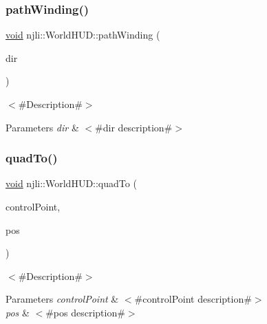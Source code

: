 \subsubsection{\texorpdfstring{path\+Winding()}{pathWinding()}}
{\footnotesize\ttfamily \mbox{\hyperlink{_thread_8h_af1e856da2e658414cb2456cb6f7ebc66}{void}} njli\+::\+World\+H\+U\+D\+::path\+Winding (\begin{DoxyParamCaption}\item[{\mbox{\hyperlink{namespacenjli_adfddace364f1f59d370037cf6f934456}{njli\+H\+U\+D\+Winding}}}]{dir }\end{DoxyParamCaption})}

$<$\#\+Description\#$>$


\begin{DoxyParams}{Parameters}
{\em dir} & $<$\#dir description\#$>$ \\
\hline
\end{DoxyParams}
\mbox{\label{classnjli_1_1_world_h_u_d_a8cefd17fd4ee43b393810cf5b6f92c3a}} 
\subsubsection{\texorpdfstring{quad\+To()}{quadTo()}\hspace{0.1cm}{\footnotesize\ttfamily [1/2]}}
{\footnotesize\ttfamily \mbox{\hyperlink{_thread_8h_af1e856da2e658414cb2456cb6f7ebc66}{void}} njli\+::\+World\+H\+U\+D\+::quad\+To (\begin{DoxyParamCaption}\item[{const bt\+Vector2 \&}]{control\+Point,  }\item[{const bt\+Vector2 \&}]{pos }\end{DoxyParamCaption})}

$<$\#\+Description\#$>$


\begin{DoxyParams}{Parameters}
{\em control\+Point} & $<$\#control\+Point description\#$>$ \\
\hline
{\em pos} & $<$\#pos description\#$>$ \\
\hline
\end{DoxyParams}
\mbox{\label{classnjli_1_1_world_h_u_d_a02ccb67d2aa481caeeb396ced6f9a8a1}} 
